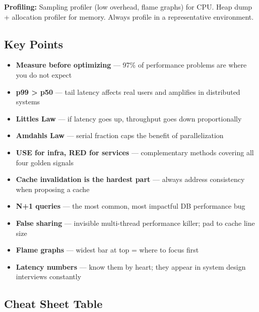 \documentclass[11pt]{article}
\providecommand{\tightlist}{\setlength{\itemsep}{1pt}\setlength{\parskip}{0pt}}
\begin{document}
\textbf{Profiling:} Sampling profiler (low overhead, flame graphs) for CPU. Heap dump + allocation profiler for memory. Always profile in a representative environment.

\subsection{Key Points}\label{key-points}

\begin{itemize}
\tightlist
\item
  \textbf{Measure before optimizing} --- 97\% of performance problems are where you do not expect
\item
  \textbf{p99 \textgreater{} p50} --- tail latency affects real users and amplifies in distributed systems
\item
  \textbf{Little\textquotesingle s Law} --- if latency goes up, throughput goes down proportionally
\item
  \textbf{Amdahl\textquotesingle s Law} --- serial fraction caps the benefit of parallelization
\item
  \textbf{USE for infra, RED for services} --- complementary methods covering all four golden signals
\item
  \textbf{Cache invalidation is the hardest part} --- always address consistency when proposing a cache
\item
  \textbf{N+1 queries} --- the most common, most impactful DB performance bug
\item
  \textbf{False sharing} --- invisible multi-thread performance killer; pad to cache line size
\item
  \textbf{Flame graphs} --- widest bar at top = where to focus first
\item
  \textbf{Latency numbers} --- know them by heart; they appear in system design interviews constantly
\end{itemize}

\subsection{Cheat Sheet Table}\label{cheat-sheet-table}
\end{document}

